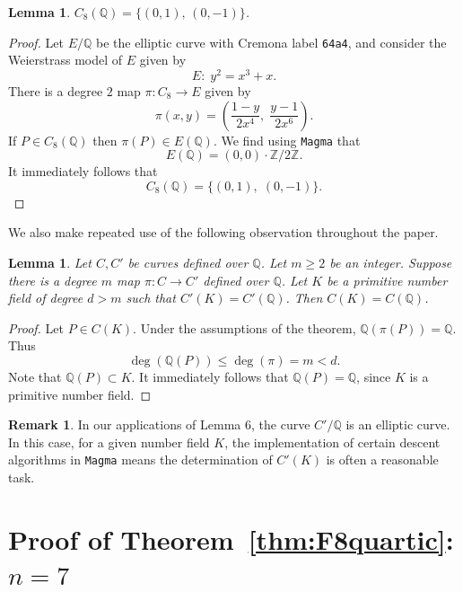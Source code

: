 \documentclass{amsart}
\newtheorem{lem}[thm]{Lemma}
\theoremstyle{definition}
\newtheorem{remark}[thm]{Remark}
\newcommand{\Z}{\mathbb{Z}}
\newcommand{\Q}{\mathbb{Q}}
\begin{document}
\begin{lem}\label{lem:C8rational}
    $C_8(\Q) = \{(0,1),\, (0,-1)\}$.
\end{lem}

\begin{proof}
Let $E/\Q$ be the elliptic curve with Cremona label \texttt{64a4}, and consider the Weierstrass model of $E$ given by 
\[
E:\; y^2 = x^3 + x.
\]
There is a degree $2$ map $\pi: C_8\rightarrow  E$
given by 
\[
\pi(x,y) = \left(\dfrac{1-y}{2x^4},\;\dfrac{y-1}{2x^6}\right).
\]
If $P\in C_8(\Q)$ then $\pi(P)\in E(\Q)$.
We find using \texttt{Magma} that
\[
E(\Q) = (0,0)\cdot \Z/2\Z.
\]
It immediately follows that 
\[
C_8(\Q)=\{(0,1),\; (0,-1)\}.
\]
\end{proof}


We also make repeated use of the following observation throughout the paper.

\begin{lem}
    \label{lem:mapequal}
    Let $C, C'$ be curves defined over $\Q$. 
    Let $m\geq 2$ be an integer. 
    Suppose there is a degree $m$ map $\pi:C\rightarrow C'$ defined over $\Q$. Let $K$ be a primitive number field of degree $d > m$ such that $C'(K)=C'(\Q)$. 
    Then $C(K)=C(\Q)$.
\end{lem}

\begin{proof}
    Let $P\in C(K)$. Under the assumptions of the theorem, $\Q(\pi(P))=\Q$. Thus 
    \[
    \deg(\Q(P))\leq \deg(\pi)=m < d.
    \]
    Note that $\Q(P)\subset K$. 
    It immediately follows that $\Q(P)=\Q$, since $K$ is a primitive number field. 
\end{proof}

\begin{remark}
In our applications of Lemma $6$, the curve $C'/\Q$ is an elliptic curve. In this case, for a given number field $K$, the implementation of certain descent algorithms in \texttt{Magma} \cite{Magma} means the determination of $C'(K)$ is often a reasonable task.
\end{remark}

\section{Proof of Theorem~\ref{thm:F8quartic}: $n = 7$}\label{sec:F87}
\end{document}
